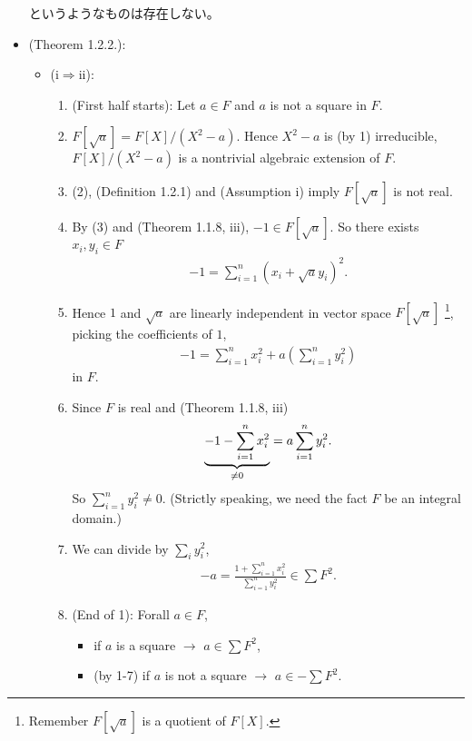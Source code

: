 \documentclass[9pt]{ltjsarticle}
\begin{document}
\begin{itemize}
\begin{itemize}
  \end{itemize}
  というようなものは存在しない。
  \item (Theorem 1.2.2.):
  \begin{itemize}
    \item (i$\Rightarrow$ii):
    \begin{enumerate}
      \item (First half starts):
       Let $a\in F$ and $a$ is not a square in $F$.
      \item
      $F[\sqrt{a}] = F[X]/(X^2-a)$.
      Hence $X^2-a$ is (by 1) irreducible,
      $F[X]/(X^2-a)$ is a nontrivial algebraic extension of $F$.
      \item
      (2), (Definition 1.2.1) and (Assumption i) imply
      $F[\sqrt{a}]$ is not real.
      \item
      By (3) and (Theorem 1.1.8, iii), $-1 \in F[\sqrt{a}]$.
      So there exists $x_i,y_i \in F$
      \begin{align}
        -1 = \sum_{i=1}^n (x_i + \sqrt{a}y_i)^2.
      \end{align}
      \item
      Hence $1$ and $\sqrt{a}$ are linearly independent in
      vector space $F[\sqrt{a}]$ \footnote{Remember $F[\sqrt{a}]$ is a quotient of $F[X]$.},
      picking the coefficients of $1$,
      \begin{align}
        -1 = \sum_{i=1}^n x_i^2 + a(\sum_{i=1}^n y_i^2)
      \end{align}
      in $F$.
      \item
      Since $F$ is real and (Theorem 1.1.8, iii)
      \begin{align}
        \underbrace{-1 - \sum_{i=1}^n x_i^2 }_{\neq 0}= a\sum_{i=1}^n y_i^2.
      \end{align}
      So $\sum_{i=1}^n y_i^2 \neq 0$.
      (Strictly speaking, we need the fact $F$ be an integral domain.)
      \item
      We can divide by $\sum_i y_i^2$,
      \begin{align}
        -a = \frac{1+\sum_{i=1}^n x_i^2}{\sum_{i=1}^n y_i^2} \in \sum F^2.
      \end{align}
      \item
      (End of 1): Forall $a\in F$,
      \begin{itemize}
        \item if $a$ is a square $\rightarrow$ $a \in \sum F^2$,
        \item (by 1-7) if $a$ is not a square $\rightarrow$ $a\in -\sum F^2$.

\end{itemize}
\end{enumerate}
\end{itemize}
\end{itemize}
\end{document}
